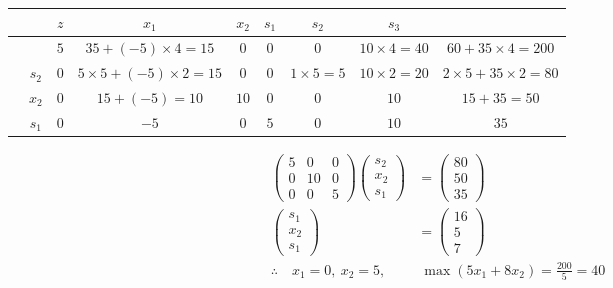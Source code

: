 \documentclass[a4paper,12pt]{article}
\begin{document}
\begin{table}[H]
    \tiny
    \begin{tabularx}{\textwidth}{cc|cccccc|c}
         &       & $z$ & $x_1$                             & $x_2$ & $s_1$ & $s_2$            & $s_3$              &                                 \\
        \hline
         &       & $5$ & $35 + (-5) \times 4 = 15$         & $0$   & $0$   & $0$              & $10 \times 4 = 40$ & $60 + 35 \times 4 = 200$        \\
        \hline
         & $s_2$ & $0$ & $5 \times 5 + (-5) \times 2 = 15$ & $0$   & $0$   & $1 \times 5 = 5$ & $10 \times 2 = 20$ & $2 \times 5 + 35 \times 2 = 80$ \\
         & $x_2$ & $0$ & $15 + (-5) = 10$                  & $10$  & $0$   & $0$              & $10$               & $15 + 35 = 50$                  \\
         & $s_1$ & $0$ & $-5$                              & $0$   & $5$   & $0$              & $10$               & $35$                            \\
    \end{tabularx}
\end{table}

\begin{align*}
    \begin{pmatrix}5 & 0 & 0 \\ 0 & 10 & 0 \\ 0 & 0 & 5\end{pmatrix} \begin{pmatrix}s_2 \\ x_2 \\ s_1\end{pmatrix} & = \begin{pmatrix}80 \\ 50 \\ 35\end{pmatrix} \\
    \begin{pmatrix}s_1 \\x_2 \\ s_1\end{pmatrix}                                                                   & = \begin{pmatrix}16 \\ 5 \\ 7\end{pmatrix}   \\
    \therefore \quad x_1 = 0, \ x_2 = 5,                                                                           & \ \max{(5 x_1 + 8 x_2)} = \frac{200}{5} = 40 \\
\end{align*}
\end{document}
